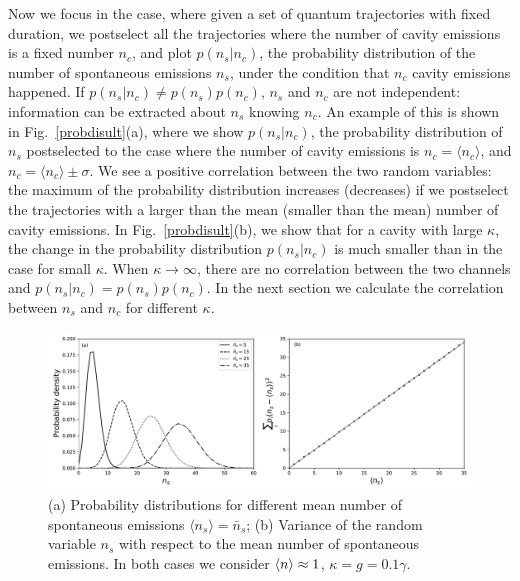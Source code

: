 \documentclass[%
 reprint,
 amsmath,amssymb,
 aps, 
]{revtex4-1}
\begin{document}
Now we focus in the case, where given a set of quantum trajectories
with fixed duration, we postselect all the trajectories where the
number of cavity emissions is a fixed number $n_c$, and plot
$p(n_s|n_c)$, the probability distribution of the number of spontaneous
emissions $n_s$, under the condition that $n_c$ cavity emissions
happened. If $p(n_s|n_c)\neq p(n_s)p(n_c)$, $n_s$ and $n_c$ are not
independent: information can be extracted about $n_s$ knowing $n_c$.
An example of this is shown in Fig.~\ref{probdisult}(a), where we
show $p(n_s|n_c)$, the probability distribution of $n_s$ postselected
to the case where the number of cavity emissions is
$n_c=\langle n_c \rangle$, and $n_c=\langle n_c \rangle\pm\sigma$. We
see a positive correlation between the two random variables: the
maximum of the probability distribution increases (decreases) if we
postselect the trajectories with a larger than the mean (smaller than
the mean) number of cavity emissions. In Fig.~\ref{probdisult}(b), we
show that for a cavity with large $\kappa$, the change in the
probability distribution $p(n_s|n_c)$ is much smaller than in the case
for small $\kappa$. When
$\kappa\rightarrow\infty$, there are no correlation between the two
channels and $p(n_s|n_c)=p(n_s)p(n_c)$.
In the next section we calculate the correlation between $n_s$ and
$n_c$ for different $\kappa$.

\begin{center}
\begin{figure}[!t]
\includegraphics[scale = 0.5]{newerrorppp.pdf}
\caption{(a) Probability distributions for different mean number of
  spontaneous emissions $\langle n_s\rangle=\bar{n}_s$; (b)
  Variance of the random variable $n_s$ with respect to the mean number of
  spontaneous emissions. In both cases we consider
  $\expval{n} \approx 1$,  $\kappa = g = 0.1\gamma$.} \label{error2}
\end{figure}
\end{center}
\end{document}
